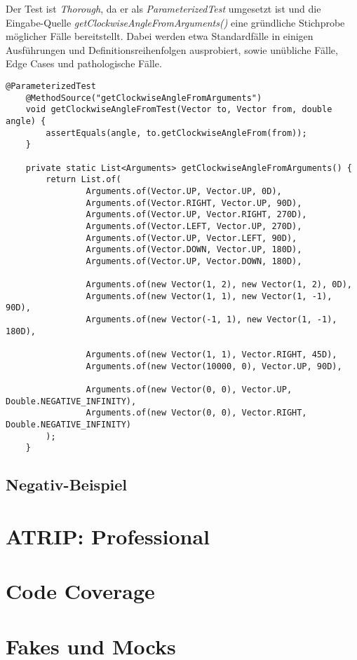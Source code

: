 Der Test ist \textit{Thorough}, da er als \textit{ParameterizedTest}
umgesetzt ist und die Eingabe-Quelle \textit{getClockwiseAngleFromArguments()}
eine gründliche Stichprobe möglicher Fälle bereitstellt. Dabei werden
etwa Standardfälle in einigen Ausführungen und Definitionsreihenfolgen
ausprobiert, sowie unübliche Fälle, Edge Cases und pathologische Fälle.


\vspace{1cm}
\begin{lstlisting}[caption={ATRIP: Thorough / Positiv}]
    @ParameterizedTest
    @MethodSource("getClockwiseAngleFromArguments")
    void getClockwiseAngleFromTest(Vector to, Vector from, double angle) {
        assertEquals(angle, to.getClockwiseAngleFrom(from));
    }
    
    private static List<Arguments> getClockwiseAngleFromArguments() {
        return List.of(
                Arguments.of(Vector.UP, Vector.UP, 0D),
                Arguments.of(Vector.RIGHT, Vector.UP, 90D),
                Arguments.of(Vector.UP, Vector.RIGHT, 270D),
                Arguments.of(Vector.LEFT, Vector.UP, 270D),
                Arguments.of(Vector.UP, Vector.LEFT, 90D),
                Arguments.of(Vector.DOWN, Vector.UP, 180D),
                Arguments.of(Vector.UP, Vector.DOWN, 180D),
                
                Arguments.of(new Vector(1, 2), new Vector(1, 2), 0D),
                Arguments.of(new Vector(1, 1), new Vector(1, -1), 90D),
                Arguments.of(new Vector(-1, 1), new Vector(1, -1), 180D),
                
                Arguments.of(new Vector(1, 1), Vector.RIGHT, 45D),
                Arguments.of(new Vector(10000, 0), Vector.UP, 90D),
                
                Arguments.of(new Vector(0, 0), Vector.UP, Double.NEGATIVE_INFINITY),
                Arguments.of(new Vector(0, 0), Vector.RIGHT, Double.NEGATIVE_INFINITY)
        );
    }
\end{lstlisting}

\subsection*{Negativ-Beispiel}

\section{ATRIP: Professional}

\section{Code Coverage}

\section{Fakes und Mocks}